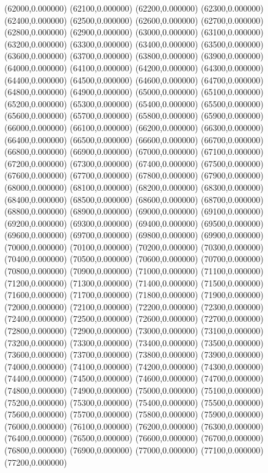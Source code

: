 (62000,0.000000)
(62100,0.000000)
(62200,0.000000)
(62300,0.000000)
(62400,0.000000)
(62500,0.000000)
(62600,0.000000)
(62700,0.000000)
(62800,0.000000)
(62900,0.000000)
(63000,0.000000)
(63100,0.000000)
(63200,0.000000)
(63300,0.000000)
(63400,0.000000)
(63500,0.000000)
(63600,0.000000)
(63700,0.000000)
(63800,0.000000)
(63900,0.000000)
(64000,0.000000)
(64100,0.000000)
(64200,0.000000)
(64300,0.000000)
(64400,0.000000)
(64500,0.000000)
(64600,0.000000)
(64700,0.000000)
(64800,0.000000)
(64900,0.000000)
(65000,0.000000)
(65100,0.000000)
(65200,0.000000)
(65300,0.000000)
(65400,0.000000)
(65500,0.000000)
(65600,0.000000)
(65700,0.000000)
(65800,0.000000)
(65900,0.000000)
(66000,0.000000)
(66100,0.000000)
(66200,0.000000)
(66300,0.000000)
(66400,0.000000)
(66500,0.000000)
(66600,0.000000)
(66700,0.000000)
(66800,0.000000)
(66900,0.000000)
(67000,0.000000)
(67100,0.000000)
(67200,0.000000)
(67300,0.000000)
(67400,0.000000)
(67500,0.000000)
(67600,0.000000)
(67700,0.000000)
(67800,0.000000)
(67900,0.000000)
(68000,0.000000)
(68100,0.000000)
(68200,0.000000)
(68300,0.000000)
(68400,0.000000)
(68500,0.000000)
(68600,0.000000)
(68700,0.000000)
(68800,0.000000)
(68900,0.000000)
(69000,0.000000)
(69100,0.000000)
(69200,0.000000)
(69300,0.000000)
(69400,0.000000)
(69500,0.000000)
(69600,0.000000)
(69700,0.000000)
(69800,0.000000)
(69900,0.000000)
(70000,0.000000)
(70100,0.000000)
(70200,0.000000)
(70300,0.000000)
(70400,0.000000)
(70500,0.000000)
(70600,0.000000)
(70700,0.000000)
(70800,0.000000)
(70900,0.000000)
(71000,0.000000)
(71100,0.000000)
(71200,0.000000)
(71300,0.000000)
(71400,0.000000)
(71500,0.000000)
(71600,0.000000)
(71700,0.000000)
(71800,0.000000)
(71900,0.000000)
(72000,0.000000)
(72100,0.000000)
(72200,0.000000)
(72300,0.000000)
(72400,0.000000)
(72500,0.000000)
(72600,0.000000)
(72700,0.000000)
(72800,0.000000)
(72900,0.000000)
(73000,0.000000)
(73100,0.000000)
(73200,0.000000)
(73300,0.000000)
(73400,0.000000)
(73500,0.000000)
(73600,0.000000)
(73700,0.000000)
(73800,0.000000)
(73900,0.000000)
(74000,0.000000)
(74100,0.000000)
(74200,0.000000)
(74300,0.000000)
(74400,0.000000)
(74500,0.000000)
(74600,0.000000)
(74700,0.000000)
(74800,0.000000)
(74900,0.000000)
(75000,0.000000)
(75100,0.000000)
(75200,0.000000)
(75300,0.000000)
(75400,0.000000)
(75500,0.000000)
(75600,0.000000)
(75700,0.000000)
(75800,0.000000)
(75900,0.000000)
(76000,0.000000)
(76100,0.000000)
(76200,0.000000)
(76300,0.000000)
(76400,0.000000)
(76500,0.000000)
(76600,0.000000)
(76700,0.000000)
(76800,0.000000)
(76900,0.000000)
(77000,0.000000)
(77100,0.000000)
(77200,0.000000)
